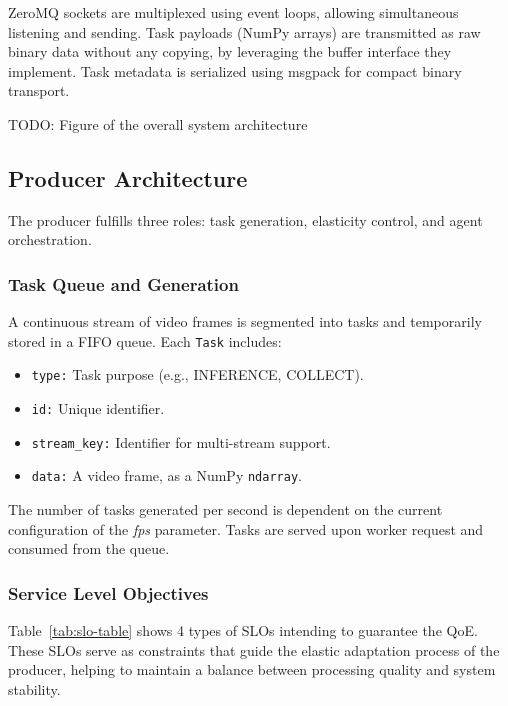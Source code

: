 ZeroMQ sockets are multiplexed using event loops, allowing simultaneous listening and sending. Task payloads (NumPy arrays) are transmitted as raw binary data without any copying, by leveraging the buffer interface they implement. Task metadata is serialized using msgpack \cite{noauthor_msgpackmsgpack-python_nodate} for compact binary transport.


TODO: Figure of the overall system architecture

\subsection{Producer Architecture}
The producer fulfills three roles: task generation, elasticity control, and agent orchestration.

\subsubsection{Task Queue and Generation}
A continuous stream of video frames is segmented into tasks and temporarily stored in a FIFO queue. Each \texttt{Task} includes:
\begin{itemize}
    \item \texttt{type:} Task purpose (e.g., INFERENCE, COLLECT).
    \item \texttt{id:} Unique identifier.
    \item \texttt{stream\_key:} Identifier for multi-stream support.
    \item \texttt{data:} A video frame, as a NumPy \texttt{ndarray}.
\end{itemize}
The number of tasks generated per second is dependent on the current configuration of the \textit{fps} parameter. Tasks are served upon worker request and consumed from the queue.

\subsubsection{Service Level Objectives}
Table~\ref{tab:slo-table} shows 4 types of SLOs intending to guarantee the QoE. These SLOs serve as constraints that guide the elastic adaptation process of the producer, helping to maintain a balance between processing quality and system stability.

